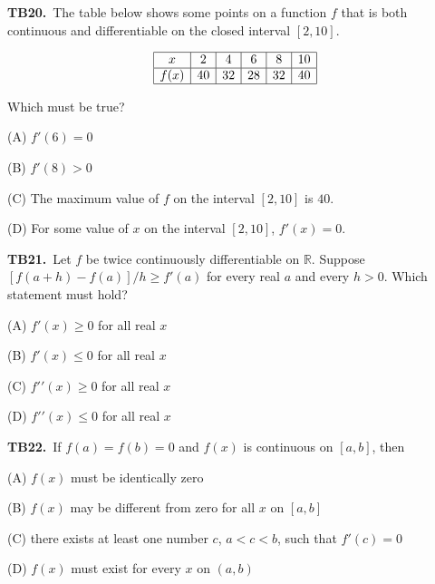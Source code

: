 \documentclass[11pt]{article}
\begin{document}
\bigskip\noindent\textbf{TB20.}\ The table below shows some points on a function $f$ that is both continuous and differentiable on the closed interval $[2,10]$.

\[\begin{array}{|c|c|c|c|c|c|}
\hline
x & 2 & 4 & 6 & 8 & 10 \\
\hline
f(x) & 40 & 32 & 28 & 32 & 40 \\
\hline
\end{array}\]

Which must be true?
\begin{list}{}{\setlength{\leftmargin}{3em}\setlength{\labelwidth}{2.5em}\setlength{\itemsep}{0pt}\setlength{\topsep}{2pt}}
\item[(A)] $f'(6) = 0$
\item[(B)] $f'(8) > 0$
\item[(C)] The maximum value of $f$ on the interval $[2,10]$ is $40$.
\item[(D)] For some value of $x$ on the interval $[2,10]$, $f'(x) = 0$.
\end{list}

\bigskip\noindent\textbf{TB21.}\ Let $f$ be twice continuously differentiable on $\mathbb R$. Suppose $[f(a+h)-f(a)]/h\ge f\prime(a)$ for every real $a$ and every $h>0$. Which statement must hold?
\begin{list}{}{\setlength{\leftmargin}{3em}\setlength{\labelwidth}{2.5em}\setlength{\itemsep}{0pt}\setlength{\topsep}{2pt}}
\item[(A)] $f\prime(x)\ge0$ for all real $x$
\item[(B)] $f\prime(x)\le0$ for all real $x$
\item[(C)] $f\prime\prime(x)\ge0$ for all real $x$
\item[(D)] $f\prime\prime(x)\le0$ for all real $x$
\end{list}

\bigskip\noindent\textbf{TB22.}\ If $f(a) = f(b) = 0$ and $f(x)$ is continuous on $[a,b]$, then
\begin{list}{}{\setlength{\leftmargin}{3em}\setlength{\labelwidth}{2.5em}\setlength{\itemsep}{0pt}\setlength{\topsep}{2pt}}
\item[(A)] $f(x)$ must be identically zero
\item[(B)] $f(x)$ may be different from zero for all $x$ on $[a,b]$
\item[(C)] there exists at least one number $c$, $a<c<b$, such that $f'(c)=0$
\item[(D)] $f(x)$ must exist for every $x$ on $(a,b)$
\end{list}
\end{document}
